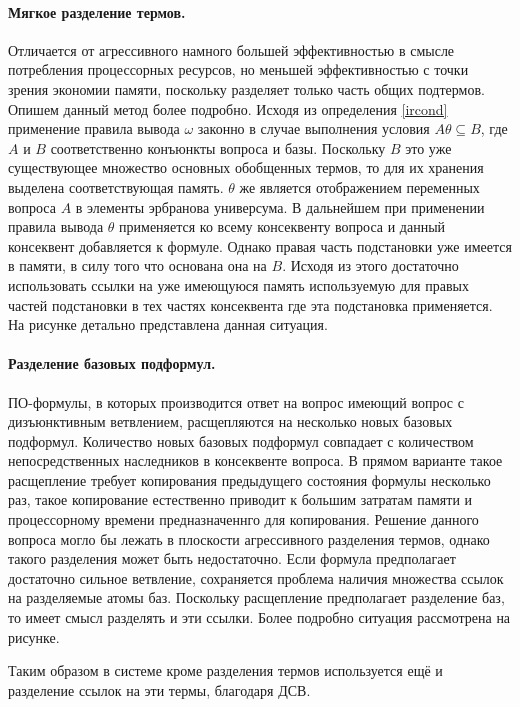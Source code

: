 \paragraph{Мягкое разделение термов.} Отличается от агрессивного намного большей эффективностью в смысле потребления процессорных ресурсов, но меньшей эффективностью с точки зрения экономии памяти, поскольку разделяет только часть общих подтермов. Опишем данный метод более подробно. Исходя из определения \ref{ircond} применение правила вывода $\omega$ законно в случае выполнения условия $A\theta \subseteq B$, где $A$ и $B$ соответственно конъюнкты вопроса и базы. Поскольку $B$ это уже существующее множество основных обобщенных термов, то для их хранения выделена соответствующая память. $\theta$ же является отображением переменных вопроса $A$ в элементы эрбранова универсума. В дальнейшем при применении правила вывода $\theta$ применяется ко всему консеквенту вопроса и данный консеквент добавляется к формуле. Однако правая часть подстановки уже имеется в памяти, в силу того что основана она на $B$. Исходя из этого достаточно использовать ссылки на уже имеющуюся память используемую для правых частей подстановки в тех частях консеквента где эта подстановка применяется. На рисунке детально представлена данная ситуация.

\paragraph{Разделение базовых подформул.} ПО-формулы, в которых производится ответ на вопрос имеющий вопрос с дизъюнктивным ветвлением, расщепляются на несколько новых базовых подформул. Количество новых базовых подформул совпадает с количеством непосредственных наследников в консеквенте вопроса. В прямом варианте такое расщепление требует копирования предыдущего состояния формулы несколько раз, такое копирование естественно приводит к большим затратам памяти и процессорному времени предназначеннго для копирования. Решение данного вопроса могло бы лежать в плоскости агрессивного разделения термов, однако такого разделения может быть недостаточно. Если формула предполагает достаточно сильное ветвление, сохраняется проблема наличия множества ссылок на разделяемые атомы баз. Поскольку расщепление предполагает разделение баз, то имеет смысл разделять и эти ссылки. Более подробно ситуация рассмотрена на рисунке.

Таким образом в системе кроме разделения термов используется ещё и разделение ссылок на эти термы, благодаря ДСВ.

